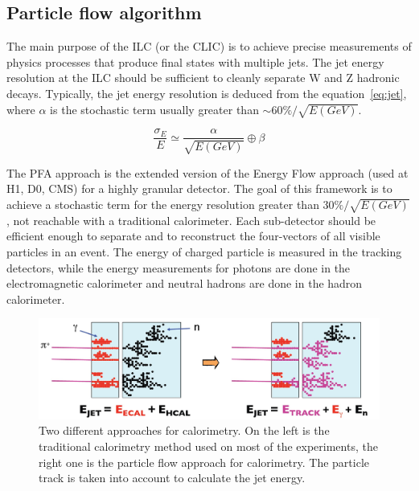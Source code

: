     \subsection{Particle flow algorithm}
    \label{subsec:PFA}

    The main purpose of the \gls{ILC} (or the \gls{CLIC}) is to achieve precise measurements of physics processes that produce final states with multiple jets.
    The jet energy resolution at the \gls{ILC} should be sufficient to cleanly separate W and Z hadronic decays.
    Typically, the jet energy resolution is deduced from the equation~\ref{eq:jet}, where $\alpha$ is the stochastic term usually greater than $\sim 60 \% / \sqrt{E(GeV)}$.

    \begin{equation}
      \frac{\sigma_E}{E} \simeq \frac{\alpha}{\sqrt{E(GeV)}} \oplus \beta
      \label{eq:jet}
    \end{equation}

    The \gls{PFA} approach is the extended version of the Energy Flow approach (used at H1, D0, CMS) for a highly granular detector. 
    The goal of this framework is to achieve a stochastic term for the energy resolution greater than $30 \% / \sqrt{E(GeV)}$, not reachable with a traditional calorimeter.
    Each sub-detector should be efficient enough to separate and to reconstruct the four-vectors of all visible particles in an event.
    The energy of charged particle is measured in the tracking detectors, while the energy measurements for photons are done in the electromagnetic calorimeter and neutral hadrons are done in the hadron calorimeter.
     
     \begin{figure}[!h]
      \centering
      \includegraphics[width = 15cm]{Pictures/ILC/physics.jpg}
      \caption{Two different approaches for calorimetry. On the left is the traditional calorimetry method used on most of the experiments, the right one is the particle flow approach for calorimetry. The particle track is taken into account to calculate the jet energy.\cite{PFA} }
      \label{fig:jetEnergy}
    \end{figure}   
    
